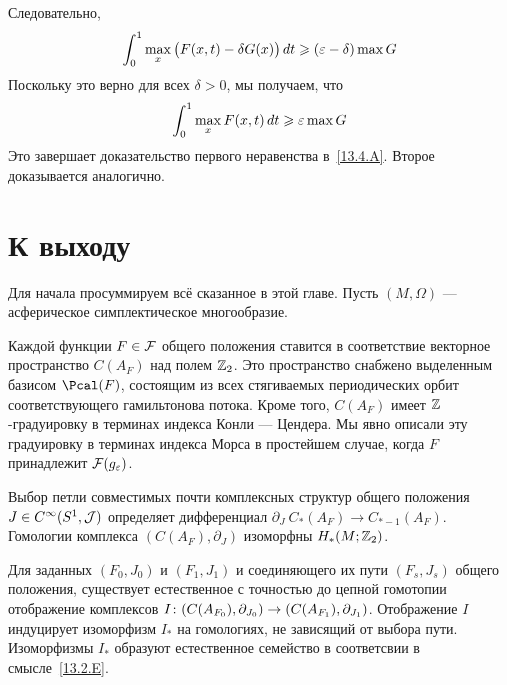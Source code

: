 Следовательно,
\[
\int_{0}^{1}\max_{x}\big(F(x,t)-\delta G(x)\big)\,d t
\geqslant
(\varepsilon-\delta)\max G
\]
Поскольку это верно для всех  $\delta > 0$, мы получаем, что
\[
\int_{0}^{1}\max_{x} F(x,t)\,d t
\geqslant
\varepsilon\max G
\]
Это завершает доказательство первого неравенства в~\ref{13.4.A}.
Второе доказывается аналогично.
\qeds

\section{К выходу}\label{13.5}

Для начала просуммируем всё сказанное в этой главе.
Пусть $(M,\Omega)$ — асферическое симплектическое многообразие.

\let\subsectionsave=\subsection
\makeatletter
\renewcommand{\subsection}{%
  \@startsection{subsection}%
  {2}%
  {0pt}%
  {1ex}%
  {0pt}%
  {\it}}
\makeatother
\def\thesubsection{\thesection.\Alph{subsection}}

\begin{ex}{}\label{13.5.A}
Каждой функции $F\in\mathcal{F}$ общего положения ставится в соответствие
векторное пространство $C(A_{F})$ над полем $\mathbb{Z}_{2}$.
Это пространство снабжено выделенным базисом $\Pcal(F)$, состоящим из
всех стягиваемых периодических орбит соответствующего гамильтонова
потока. 
Кроме того, $C(A_{F})$ имеет $\mathbb{Z}$-градуировку в терминах индекса
Конли — Цендера. 
Мы явно описали эту градуировку в терминах индекса Морса в простейшем
случае, когда $F$ принадлежит $\mathcal{F}(g_{\varepsilon})$.
\end{ex}

\begin{ex}{}\label{13.5.B}
Выбор петли совместимых почти комплексных структур общего положения
$J\in C^{\infty}(S^{1}, \mathcal{J})$ определяет дифференциал
$\partial_{J}\:C_{*}(A_{F})\to C_{*-1}(A_{F})$.
Гомологии комплекса $(C(A_{F}),\partial_{J})$ изоморфны
$H_{*}(M;\mathbb{Z}_{2})$. 
\end{ex}

\begin{ex}{}\label{13.5.C}
Для заданных $(F_{0},J_{0})$ и $(F_{1},J_{1})$ и соединяющего их пути
$(F_{s},J_{s})$ общего положения, существует естественное с точностью
до цепной гомотопии отображение 
комплексов $I\:(C(A_{F_{0}}),\partial_{J_{0}})\z\to(C(A_{F_{1}}),\partial_{J_{1}})$.
Отображение $I$ индуцирует изоморфизм $I_{*}$ на гомологиях, не
зависящий от выбора пути. 
Изоморфизмы $I_{*}$ образуют естественное
семейство в соответсвии в смысле~\ref{13.2.E}. 
\end{ex}

